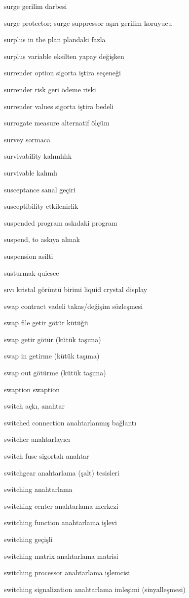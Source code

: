 \documentclass[12pt,fleqn]{article}\usepackage{../../common}
\begin{document}
surge gerilim darbesi

surge protector; surge suppressor aşırı gerilim koruyucu

surplus in the plan plandaki fazla

surplus variable eksilten yapay değişken

surrender option sigorta iştira seçeneği

surrender risk geri ödeme riski

surrender values sigorta iştira bedeli

surrogate measure alternatif ölçüm

survey sormaca

survivability kalımlılık

survivable kalımlı

susceptance sanal geçiri

susceptibility etkilenirlik

suspended program askıdaki program

suspend, to askıya almak

suspension asilti

susturmak quiesce

sıvı kristal görüntü birimi liquid crystal display

swap contract vadeli takas/değişim sözleşmesi

swap file getir götür kütüğü

swap getir götür (kütük taşıma)

swap in getirme (kütük taşıma)

swap out götürme (kütük taşıma)

swaption swaption

switch açkı, anahtar

switched connection anahtarlanmış bağlantı

switcher anahtarlayıcı

switch fuse sigortalı anahtar

switchgear anahtarlama (şalt) tesisleri

switching anahtarlama

switching center anahtarlama merkezi

switching function anahtarlama işlevi

switching geçişli

switching matrix anahtarlama matrisi

switching processor anahtarlama işlemcisi

switching signalization anahtarlama imleşimi (sinyalleşmesi)
\end{document}
